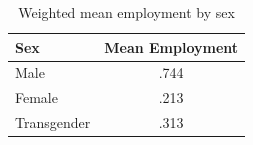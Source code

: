 \begin{table}[htbp]
\centering
\caption{Weighted mean employment by sex}
\begin{tabular}{lc}
\toprule
Sex & Mean Employment \\
\midrule
Male&.744\\
Female&.213\\
Transgender&.313\\
\bottomrule
\end{tabular}
\end{table}

